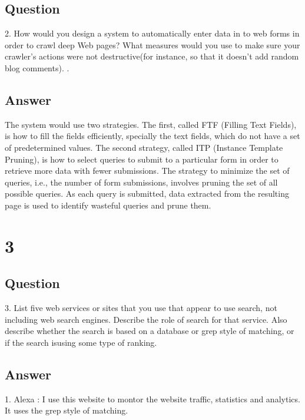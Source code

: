 \documentclass[letterpaper,11pt]{article}
\begin{document}
\subsection*{Question}


2.   How would you design a system to automatically enter data in to web forms in order to crawl deep Web pages? What measures would you use to make sure your crawler’s actions were not destructive(for instance, so that it doesn’t add random blog comments). .


\subsection*{Answer}


The system would use two strategies. The first, called FTF (Filling Text Fields), is how to
fill the fields efficiently, specially the text fields, which do not have a set of predetermined
values. The second strategy, called ITP (Instance Template Pruning),
is how to select queries to submit to a particular form in order to retrieve
more data with fewer submissions. The strategy to minimize the set of queries,
i.e., the number of form submissions, involves pruning the set of all possible
queries. As each query is submitted, data extracted from the resulting page is
used to identify wasteful queries and prune them.
\clearpage


\section*{3}

\subsection*{Question}


3. List five web services or sites that you use that appear to use search, not including web search engines. Describe the role of search for that service. Also describe whether the search is based on a database or grep style of matching, or if the search isusing some type of ranking.


\subsection*{Answer}

 1. Alexa : I use this website to montor the website traffic, statistics and analytics. It uses the grep style of matching.
\end{document}
